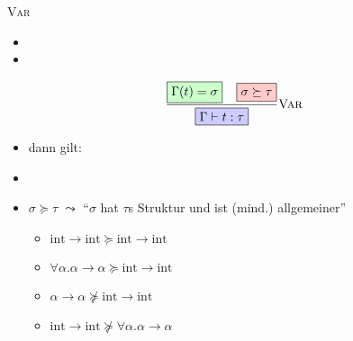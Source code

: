 \documentclass{beamer}
\begin{document}
\begin{frame}{\textsc{Var}}
	\begin{itemize}
		\item {}
		\item {}
	\end{itemize}

	\begin{equation*}
		\frac{
			\tikz[baseline, remember picture]{\node[fill=green!20,draw] (varRet) {$\Gamma{}(t) = \sigma$};}
			\;\;\;\;
			\tikz[baseline, remember picture]{\node[fill=red!20,draw] (varEat) {$\sigma \succeq \tau$};}
		}{
			\tikz[baseline, remember picture]{\node[fill=blue!20,draw] (varShow) {
				$\Gamma \vdash t : \tau$
			};}
		} \textrm{\textsc{Var}}
	\end{equation*}

	\begin{itemize}
		\item dann gilt:
		\item {}
		\vspace{0.5em}
		\item $\sigma \succeq \tau$ $\leadsto$ \enquote{$\sigma$ hat $\tau$s Struktur und ist (mind.) allgemeiner}
		\begin{itemize}
			\item $\textrm{int} \to \textrm{int} \succeq \textrm{int} \to \textrm{int}$
			\item $\forall \alpha . \alpha \to \alpha \succeq \textrm{int} \to \textrm{int}$
			\item $\alpha \to \alpha \not\succeq \textrm{int} \to \textrm{int}$
			\item $\textrm{int} \to \textrm{int} \not\succeq \forall \alpha . \alpha \to \alpha$
		\end{itemize}
	\end{itemize}

\end{frame}

\newcommand{\tikzmark}[3]{\tikz[baseline, remember picture]{
	\node[fill=#1,draw] (#2) {#3};
}}
\end{document}
